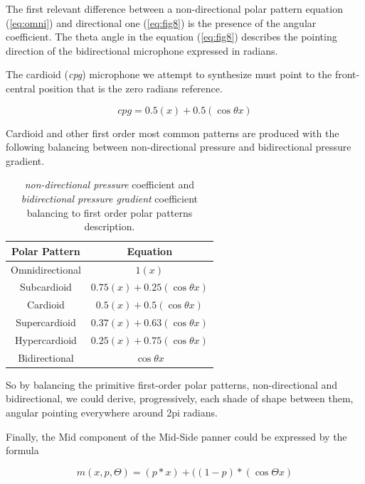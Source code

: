 \documentclass{article}
\begin{document}
The first relevant difference between a non-directional polar pattern equation (\ref{eq:omni}) and directional one (\ref{eq:fig8}) is the presence of the angular coefficient. The theta angle in the equation (\ref{eq:fig8}) describes the pointing direction of the bidirectional microphone expressed in radians.

The cardioid (\emph{cpg}) microphone we attempt to synthesize must point to the front-central position that is the zero radians reference.

\begin{equation}
cpg = 0.5(x) + 0.5(\cos\theta x)
\label{eq:cardioid}
\end{equation}

Cardioid and other first order most common patterns are produced with the following balancing between non-directional pressure and bidirectional pressure gradient.

\begin{table}[h]
 \begin{center}
 \begin{tabular}{cc}
  Polar Pattern & Equation \\
  \hline
  Omnidirectional & $ 1(x) $ \\
  Subcardioid     & $ 0.75(x) + 0.25(\cos\theta x) $ \\
  Cardioid        & $ 0.5(x) + 0.5(\cos\theta x) $ \\
  Supercardioid   & $ 0.37(x) + 0.63(\cos\theta x) $ \\
  Hypercardioid   & $ 0.25(x) + 0.75(\cos\theta x) $ \\
  Bidirectional   & $ \cos\theta x $ \\
 \end{tabular}
\end{center}
 \caption{\emph{non-directional pressure} coefficient and \emph{bidirectional pressure gradient} coefficient balancing to first order polar patterns description.}
 \label{tab:example}
\end{table}

So by balancing the primitive first-order polar patterns, non-directional and bidirectional, we could derive, progressively, each shade of shape between them, angular pointing everywhere around 2pi radians.

Finally, the Mid component of the Mid-Side panner could be expressed by the formula

\begin{equation}
m(x,p,\Theta) = (p*x) + ((1-p)*(\cos\Theta x)
\label{eq:mid}
\end{equation}
\end{document}
